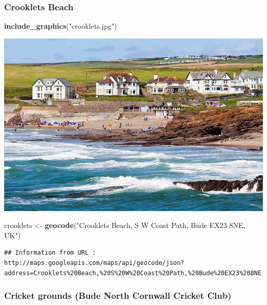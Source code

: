 \documentclass[]{article}
\newenvironment{Shaded}{\begin{snugshade}}{\end{snugshade}}
\newcommand{\KeywordTok}[1]{\textcolor[rgb]{0.13,0.29,0.53}{\textbf{#1}}}
\newcommand{\NormalTok}[1]{#1}
\newcommand{\StringTok}[1]{\textcolor[rgb]{0.31,0.60,0.02}{#1}}
\begin{document}
\hypertarget{crooklets-beach}{%
\subsubsection{Crooklets Beach}\label{crooklets-beach}}

\begin{Shaded}
\begin{Highlighting}[]
\KeywordTok{include_graphics}\NormalTok{(}\StringTok{"crooklets.jpg"}\NormalTok{)}
\end{Highlighting}
\end{Shaded}

\includegraphics[width=2\linewidth]{crooklets}

\begin{Shaded}
\begin{Highlighting}[]
\NormalTok{crooklets <-}\StringTok{ }\KeywordTok{geocode}\NormalTok{(}\StringTok{"Crooklets Beach, S W Coast Path, Bude EX23 8NE, UK"}\NormalTok{)}
\end{Highlighting}
\end{Shaded}

\begin{verbatim}
## Information from URL : http://maps.googleapis.com/maps/api/geocode/json?address=Crooklets%20Beach,%20S%20W%20Coast%20Path,%20Bude%20EX23%208NE,%20UK&sensor=false
\end{verbatim}

\hypertarget{cricket-grounds-bude-north-cornwall-cricket-club}{%
\subsubsection{Cricket grounds (Bude North Cornwall Cricket
Club)}\label{cricket-grounds-bude-north-cornwall-cricket-club}}
\end{document}
